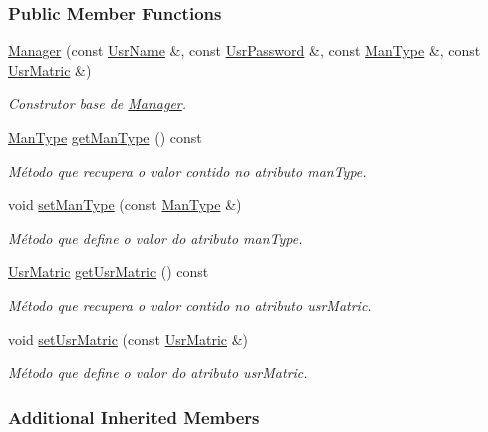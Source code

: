 \subsubsection*{Public Member Functions}
\begin{DoxyCompactItemize}
\item 
\hyperlink{classManager_ad2ee8089f5e80bc03fabcf9a493d045b}{Manager} (const \hyperlink{classUsrName}{Usr\-Name} \&, const \hyperlink{classUsrPassword}{Usr\-Password} \&, const \hyperlink{classUsrType}{Man\-Type} \&, const \hyperlink{classUsrMatric}{Usr\-Matric} \&)
\begin{DoxyCompactList}\small\item\em Construtor base de \hyperlink{classManager}{Manager}. \end{DoxyCompactList}\item 
\hyperlink{classUsrType}{Man\-Type} \hyperlink{classManager_a255ac6a7e2112631001296fa8db3811b}{get\-Man\-Type} () const 
\begin{DoxyCompactList}\small\item\em Método que recupera o valor contido no atributo man\-Type. \end{DoxyCompactList}\item 
void \hyperlink{classManager_a3d4e9cb6cc0e8d9be47fcc086b4e584e}{set\-Man\-Type} (const \hyperlink{classUsrType}{Man\-Type} \&)
\begin{DoxyCompactList}\small\item\em Método que define o valor do atributo man\-Type. \end{DoxyCompactList}\item 
\hyperlink{classUsrMatric}{Usr\-Matric} \hyperlink{classManager_a462f3704b016b57e087db417df73f07a}{get\-Usr\-Matric} () const 
\begin{DoxyCompactList}\small\item\em Método que recupera o valor contido no atributo usr\-Matric. \end{DoxyCompactList}\item 
void \hyperlink{classManager_a93309a0dde84dd0b5fe90d9e1da49822}{set\-Usr\-Matric} (const \hyperlink{classUsrMatric}{Usr\-Matric} \&)
\begin{DoxyCompactList}\small\item\em Método que define o valor do atributo usr\-Matric. \end{DoxyCompactList}\end{DoxyCompactItemize}
\subsubsection*{Additional Inherited Members}


